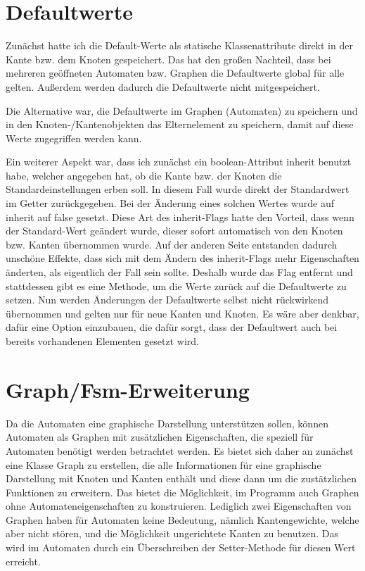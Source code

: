\section{Defaultwerte}
Zunächst hatte ich die Default-Werte als statische Klassenattribute direkt in der Kante bzw. dem Knoten gespeichert. Das hat den großen Nachteil, dass bei mehreren geöffneten Automaten bzw. Graphen die Defaultwerte global für alle gelten. Außerdem werden dadurch die Defaultwerte nicht mitgespeichert.

Die Alternative war, die Defaultwerte im Graphen (Automaten) zu speichern und in den Knoten-/Kantenobjekten das Elternelement zu speichern, damit auf diese Werte zugegriffen werden kann.

Ein weiterer Aspekt war, dass ich zunächst ein boolean-Attribut inherit benutzt habe, welcher angegeben hat, ob die Kante bzw. der Knoten die Standardeinstellungen erben soll. In diesem Fall wurde direkt der Standardwert im Getter zurückgegeben. Bei der Änderung eines solchen Wertes wurde auf inherit auf false gesetzt. Diese Art des inherit-Flags hatte den Vorteil, dass wenn der Standard-Wert geändert wurde, dieser sofort automatisch von den Knoten bzw. Kanten übernommen wurde. Auf der anderen Seite entstanden dadurch unschöne Effekte, dass sich  mit dem Ändern des inherit-Flags mehr Eigenschaften änderten, als eigentlich der Fall sein sollte. Deshalb wurde das Flag entfernt und stattdessen gibt es eine Methode, um die Werte zurück auf die Defaultwerte zu setzen. Nun werden Änderungen der Defaultwerte selbst nicht rückwirkend übernommen und gelten nur für neue Kanten und Knoten. Es wäre aber denkbar, dafür eine Option einzubauen, die dafür sorgt, dass der Defaultwert auch bei bereits vorhandenen Elementen gesetzt wird.
\section{Graph/Fsm-Erweiterung}
Da die Automaten eine graphische Darstellung unterstützen sollen, können Automaten als Graphen mit zusätzlichen Eigenschaften, die speziell für Automaten benötigt werden betrachtet werden. Es bietet sich daher an zunächst eine Klasse Graph zu erstellen, die alle Informationen für eine graphische Darstellung mit Knoten und Kanten enthält und diese dann um die zustätzlichen Funktionen zu erweitern. Das bietet die Möglichkeit, im Programm auch Graphen ohne Automateneigenschaften zu konstruieren. Lediglich zwei Eigenschaften von Graphen haben für Automaten keine Bedeutung, nämlich Kantengewichte, welche aber nicht stören, und die Möglichkeit ungerichtete Kanten zu benutzen. Das wird im Automaten durch ein Überschreiben der Setter-Methode für diesen Wert erreicht.

